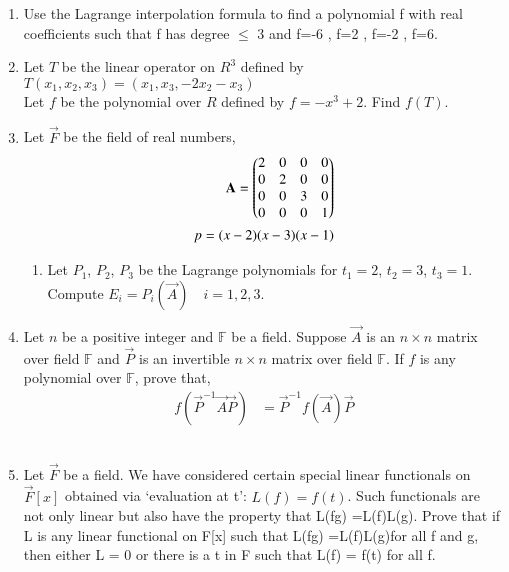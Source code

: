 \renewcommand{\theequation}{\theenumi}
\renewcommand{\thefigure}{\theenumi}
\begin{enumerate}[label=\thesubsection.\arabic*.,ref=\thesubsection.\theenumi]

\item Use the Lagrange interpolation formula to find a polynomial f with real coefficients such that f has degree $\leq$ 3 and f=-6 , f=2 , f=-2 , f=6.
%
\\
\solution

\item Let $T$ be the linear operator on $R^3$ defined by\\
$T(x_1,x_2,x_3)=(x_1,x_3,-2x_2-x_3)$\\
Let $f$ be the polynomial over $R$ defined by $f=-x^3+2$. Find $f(T)$.
%
\\
\solution

\item Let $\vec{F}$ be the field of real numbers, 
\begin{align}
\mathbf{A}=\begin{pmatrix}2&0&0&0\\0&2&0&0\\0&0&3&0\\0&0&0&1\end{pmatrix}\\
p= (x - 2)(x - 3)(x - 1) 
\end{align}
\begin{enumerate}
\item Let $P_1$, $P_2$, $P_3$ be the Lagrange polynomials for $t_1 = 2$, $t_2 = 3$, $t_3 = 1$. Compute $E_i = P_i(\vec{A})\quad i = 1, 2, 3$. 
%
\\
\solution

\end{enumerate}
\item Let $n$ be a positive integer and $\mathbb{F}$ be a field. Suppose $\vec{A}$ is an $n \times n$ matrix over field $\mathbb{F}$ and $\vec{P}$ is an invertible $n \times n$ matrix over field $\mathbb{F}$. If $f$ is any polynomial over $\mathbb{F}$, prove
that,
\begin{align}
f(\vec{P}^{-1}\vec{A}\vec{P}) &= \vec{P}^{-1}f(\vec{A})\vec{P}
\end{align}
%
\\
\solution

\item Let $\vec{F}$ be a field. We have considered certain special linear functionals on $\vec{F}[x]$
obtained via ‘evaluation at t’:
$L(f) = f(t)$.
Such functionals are not only linear but also have the property that L(fg) =L(f)L(g). Prove that if L is any linear functional on F[x] such that L(fg) =L(f)L(g)for all f and g, then either L = 0 or there is a t in F such that L(f) = f(t) for all f.
%
\\
\solution

\end{enumerate}
